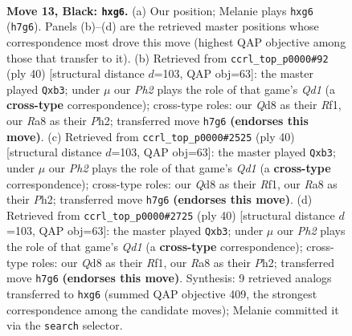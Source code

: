 \documentclass[11pt]{article}
\begin{document}
\clearpage

\begin{figure}[p]\centering
\begin{subfigure}{0.46\textwidth}\centering
\resizebox{\linewidth}{!}{%
\newchessgame
\chessboard[
  setfen={rnbqk2r/pp4bp/6P1/8/3pP1P1/8/P7/R1BQKBNR b KQkq - 0 13},
  showmover=false,
  pgfstyle=straightmove, color=movearrow, markmove={h7-g6}
]}
\caption{}
\end{subfigure}\hfill
\begin{subfigure}{0.46\textwidth}\centering
\resizebox{\linewidth}{!}{%
\newchessgame
\chessboard[
  setfen={1r1q3k/3b2pp/3p4/3Nprb1/1PB5/1p6/5PPP/R2Q1RK1 w - - 0 21},
  showmover=false,
  pgfstyle=straightmove, color=movearrow, markmove={d1-b3}
]}
\caption{}
\end{subfigure}
\\[4pt]
\begin{subfigure}{0.46\textwidth}\centering
\resizebox{\linewidth}{!}{%
\newchessgame
\chessboard[
  setfen={1r1q3k/3b2pp/3p4/3Nprb1/1PB5/1p6/5PPP/R2Q1RK1 w - - 0 21},
  showmover=false,
  pgfstyle=straightmove, color=movearrow, markmove={d1-b3}
]}
\caption{}
\end{subfigure}\hfill
\begin{subfigure}{0.46\textwidth}\centering
\resizebox{\linewidth}{!}{%
\newchessgame
\chessboard[
  setfen={1r1q3k/3b2pp/3p4/3Nprb1/1PB5/1p6/5PPP/R2Q1RK1 w - - 0 21},
  showmover=false,
  pgfstyle=straightmove, color=movearrow, markmove={d1-b3}
]}
\caption{}
\end{subfigure}
\caption{\textbf{Move 13, Black: \texttt{hxg6}.} (a) Our position; Melanie plays \texttt{hxg6} (\texttt{h7g6}). Panels (b)--(d) are the retrieved master positions whose correspondence most drove this move (highest QAP objective among those that transfer to it). (b) Retrieved from \texttt{ccrl\_top\_p0000\#92} (ply 40) [structural distance $d$=103, QAP obj=63]: the master played \texttt{Qxb3}; under $\mu$ our \emph{Ph2} plays the role of that game's \emph{Qd1} (a \textbf{cross-type} correspondence); cross-type roles: our \emph{Q}d8 as their \emph{R}f1, our \emph{R}a8 as their \emph{P}h2; transferred move \texttt{h7g6} \textbf{(endorses this move)}. (c) Retrieved from \texttt{ccrl\_top\_p0000\#2525} (ply 40) [structural distance $d$=103, QAP obj=63]: the master played \texttt{Qxb3}; under $\mu$ our \emph{Ph2} plays the role of that game's \emph{Qd1} (a \textbf{cross-type} correspondence); cross-type roles: our \emph{Q}d8 as their \emph{R}f1, our \emph{R}a8 as their \emph{P}h2; transferred move \texttt{h7g6} \textbf{(endorses this move)}. (d) Retrieved from \texttt{ccrl\_top\_p0000\#2725} (ply 40) [structural distance $d$=103, QAP obj=63]: the master played \texttt{Qxb3}; under $\mu$ our \emph{Ph2} plays the role of that game's \emph{Qd1} (a \textbf{cross-type} correspondence); cross-type roles: our \emph{Q}d8 as their \emph{R}f1, our \emph{R}a8 as their \emph{P}h2; transferred move \texttt{h7g6} \textbf{(endorses this move)}. Synthesis: 9 retrieved analogs transferred to \texttt{hxg6} (summed QAP objective 409, the strongest correspondence among the candidate moves); Melanie committed it via the \texttt{search} selector.}
\label{fig:thought-m25}
\end{figure}
\end{document}
